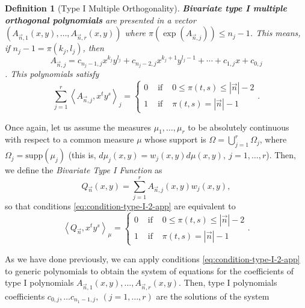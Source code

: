 \documentclass[12pt,a4]{report}
\theoremstyle{plain}
\newtheorem{definition}[theorem]{Definition}
\newcommand{\supp}[0]{\mathrm{supp}}
\newcommand{\prodesc}[2]{\left\langle #1 , #2 \right\rangle}
\begin{document}
\begin{definition}[Type I Multiple Orthogonality]
  \textbf{Bivariate type I multiple orthogonal polynomials} are presented in a vector $(A_{\vec n,1}(x,y),\dots,A_{\vec n,r}(x,y))$ where $\pi(\exp(A_{\vec n,j})) \leq n_j-1$. This means, if $n_j-1 = \pi(k_j,l_j)$, then $$A_{\vec n,j} = c_{n_j-1,j} x^{k_j}y^{l_j}+ c_{n_j-2,j}x^{k_j+1}y^{l_j-1} +\cdots +c_{1,j} x + c_{0,j}$$. This polynomials satisfy
  \begin{equation}
    \label{eq:condition-type-I-2-app}
    \sum_{j=1}^r \prodesc{A_{\vec n,j}}{x^t y^s}_j = \left\{\begin{array}{ccl}
        0 &   \text{ if } & 0\leq \pi(t,s)\leq |\vec n|-2 \\
        1 & \text{ if } & \pi(t,s)= |\vec n|-1     
    \end{array}\right..
  \end{equation}
\end{definition}

Once again, let us assume the measures $\mu_1,\dots,\mu_r$ to be absolutely continuous with respect to a common measure $\mu$ whose support is $\Omega = \displaystyle\bigcup_{j=1}^r \Omega_j$, where $\Omega_j=\supp(\mu_j)$ (this is, $d\mu_j(x,y)=w_j(x,y)d\mu(x,y), \ j=1,\dots,r$). Then, we define the \textit{Bivariate Type I Function} as
\begin{equation}
    \label{eq:typeI-function-2-app}
    Q_{\vec n}(x,y)=\sum_{j=1}^r A_{\vec n,j}(x,y) w_j(x,y),
\end{equation}
so that conditions \eqref{eq:condition-type-I-2-app} are equivalent to
\begin{equation}
    \label{wq:typeI-conditions-function-2-app}
    \prodesc{Q_{\vec n}}{x^t y^s}_\mu = \left\{\begin{array}{ccl}
        0 &   \text{ if } & 0\leq \pi(t,s)\leq |\vec n|-2 \\
        1 & \text{ if } & \pi(t,s)= |\vec n|-1     
    \end{array}\right..
\end{equation}

As we have done previously, we can apply conditions \eqref{eq:condition-type-I-2-app} to generic polynomials to obtain the system of equations for the coefficients of type I polynomials $A_{\vec n,1}(x,y),\dots,A_{\vec n, r}(x,y)$. Then, type I polynomials coefficients $c_{0,j},\dots c_{n_1-1,j}, \ (j=1,\dots,r)$ are the solutions of the system 
\end{document}
